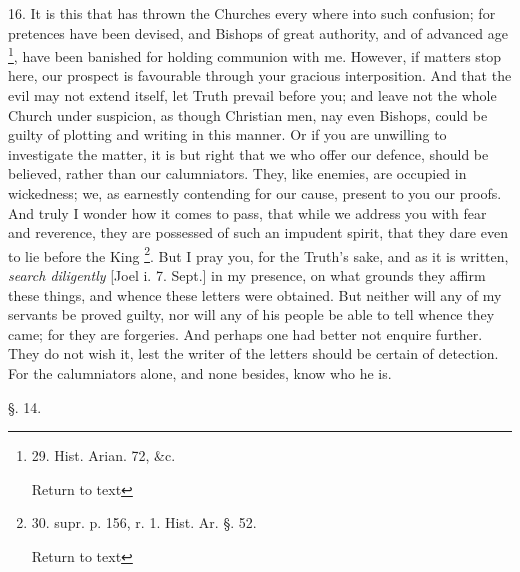 16. It is this that has thrown the Churches every where into such
confusion; for pretences have been devised, and Bishops of great
authority, and of advanced age \footnote{29. Hist. Arian. 72, \&c.

Return to text}, have been banished for holding communion with me. However, if
matters stop here, our prospect is favourable through your gracious
interposition. And that the evil may not extend itself, let Truth
prevail before you; and leave not the whole Church under suspicion, as
though Christian men, nay even Bishops, could be guilty of plotting
and writing in this manner. Or if you are unwilling to investigate the
matter, it is but right that we who offer our defence, should be
believed, rather than our calumniators. They, like enemies, are
occupied in wickedness; we, as earnestly contending for our cause,
present to you our proofs. And truly I wonder how it comes to pass,
that while we address you with fear and reverence, they are possessed
of such an impudent spirit, that they dare even to lie before the King
\footnote{30. supr. p. 156, r. 1. Hist. Ar. §. 52.

Return to text}. But I pray you, for
the Truth's sake, and as it is written, \emph{search diligently}
[Joel i. 7. Sept.] in my presence, on what grounds they affirm these
things, and whence these letters were obtained. But neither will any
of my servants be proved guilty, nor will any of his people be able to
tell whence they came; for they are forgeries. And perhaps one had
better not enquire further. They do not wish it, lest the writer of
the letters should be certain of detection. For the calumniators
alone, and none besides, know who he is.

§. 14.

